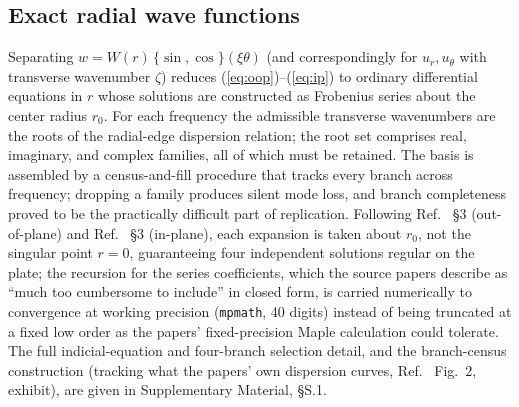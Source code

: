 \documentclass[11pt]{article}
\begin{document}
\subsection{Exact radial wave functions}
Separating $w=W(r)\,\{\sin,\cos\}(\xi\theta)$ (and correspondingly for
$u_r,u_\theta$ with transverse wavenumber $\zeta$) reduces
(\ref{eq:oop})--(\ref{eq:ip}) to ordinary differential equations in $r$
whose solutions are constructed as Frobenius series about the center
radius $r_0$. For each frequency the admissible transverse wavenumbers are the
roots of the radial-edge dispersion relation; the root set comprises
real, imaginary, and complex families, all of which must be retained. The
basis is assembled by a census-and-fill procedure that tracks every branch
across frequency; dropping a family produces silent mode loss, and branch
completeness proved to be the practically difficult part of replication.
Following Ref.~\cite{seok1} \S3 (out-of-plane) and Ref.~\cite{seok2} \S3
(in-plane), each expansion is taken about $r_0$, not the singular
point $r=0$, guaranteeing four independent solutions regular on the
plate; the recursion for the series coefficients, which the source papers
describe as ``much too cumbersome to include'' in closed form, is carried
numerically to convergence at working precision (\texttt{mpmath}, 40
digits) instead of being truncated at a fixed low order as the papers'
fixed-precision Maple calculation could tolerate. The full
indicial-equation and four-branch selection detail, and the branch-census
construction (tracking what the papers' own dispersion curves,
Ref.~\cite{seok1} Fig.~2, exhibit), are given in Supplementary
Material, §S.1.
\end{document}
